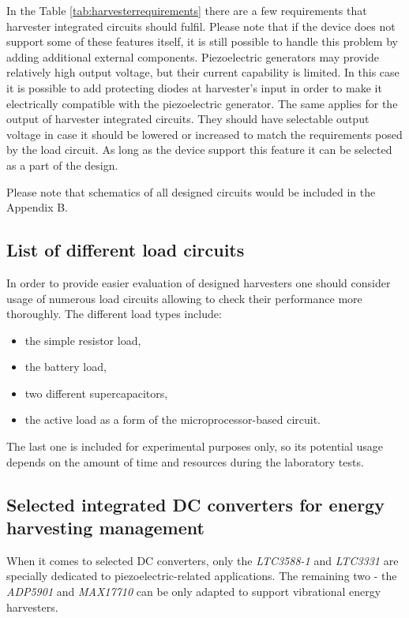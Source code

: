 \documentclass[12pt,a4paper]{article}
\begin{document}
In the Table \ref{tab:harvesterrequirements} there are a few requirements that harvester integrated circuits should fulfil. Please note that if the device does not support some of these features itself, it is still possible to handle this problem by adding additional external components. Piezoelectric generators may provide relatively high output voltage, but their current capability is limited. In this case it is possible to add protecting diodes at harvester's input in order to make it electrically compatible with the piezoelectric generator.
The same applies for the output of harvester integrated circuits. They should have selectable output voltage in case it should be lowered or increased to match the requirements posed by the load circuit. As long as the device support this feature it can be selected as a part of the design.
\par
Please note that schematics of all designed circuits would be included in the Appendix B.

\subsection{List of different load circuits}
In order to provide easier evaluation of designed harvesters one should consider usage of numerous load circuits allowing to check their performance more thoroughly.
The different load types include:
\begin{itemize}

\item the simple resistor load,
\item the battery load,
\item two different supercapacitors,
\item the active load as a form of the microprocessor-based circuit.

\end{itemize}

The last one is included for experimental purposes only, so its potential usage depends on the amount of time and resources during the laboratory tests.
\par

\subsection{Selected integrated DC converters for energy harvesting management}
When it comes to selected DC converters, only the \textit{LTC3588-1} and \textit{LTC3331} are specially dedicated to piezoelectric-related applications. The remaining two - the \textit{ADP5901} and \textit{MAX17710} can be only adapted to support vibrational energy harvesters.
\par
\end{document}
